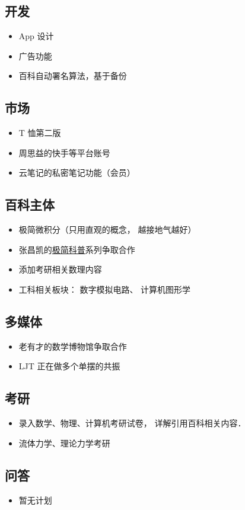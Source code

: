 
\subsection{开发}
\begin{itemize}
\item App 设计
\item 广告功能
\item 百科自动署名算法，基于备份
\end{itemize}

\subsection{市场}
\begin{itemize}
\item T 恤第二版
\item 周思益的快手等平台账号
\item 云笔记的私密笔记功能（会员）
\end{itemize}

\subsection{百科主体}
\begin{itemize}
\item 极简微积分（只用直观的概念， 越接地气越好）
\item 张昌凯的\href{https://www.zhihu.com/column/c_1328480072068386816}{极简科普}系列争取合作
\item 添加考研相关数理内容
\item 工科相关板块： 数字模拟电路、 计算机图形学
\end{itemize}

\subsection{多媒体}
\begin{itemize}
\item 老有才的数学博物馆争取合作
\item LJT 正在做多个单摆的共振
\end{itemize}

\subsection{考研}
\begin{itemize}
\item 录入数学、物理、计算机考研试卷， 详解引用百科相关内容．
\item 流体力学、理论力学考研
\end{itemize}

\subsection{问答}
\begin{itemize}
\item 暂无计划
\end{itemize}
